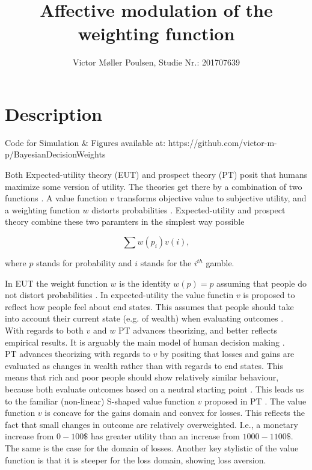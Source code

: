 \documentclass[12pt]{article}
\title{Affective modulation of the weighting function}
\author{Victor Møller Poulsen, Studie Nr.: 201707639}
\begin{document}
\maketitle
\leavevmode

\section{Description}

Code for Simulation \& Figures available at:
https://github.com/victor-m-p/BayesianDecisionWeights

Both Expected-utility theory (EUT) and prospect theory
(PT) posit that humans maximize some version of
utility. The theories get there by a
combination of two functions
\autocite{rottenstreich2001money}.
A value function $v$ transforms objective value to
subjective utility, and a weighting function $w$
distorts probabilities \autocite{rottenstreich2001money,
gonzalez1999shape}. Expected-utility and
prospect theory combine these two paramters in
the simplest way possible
\autocite{rottenstreich2001money}

\[
	\sum w(p_i)v(i),
\]

where $p$ stands for probability and $i$ stands for the
$i^{th}$ gamble.

In EUT the weight function $w$
is the identity $w(p) = p$ assuming that people do
not distort probabilities \autocite{rottenstreich2001money}.
In expected-utility the value functin $v$ is
proposed to reflect how people feel about
end states. This assumes that people should
take into account their current state (e.g. of wealth)
when evaluating outcomes
\autocite{newell2015straight}. \\

With regards to both $v$ and  $w$
PT \autocite{
	PT,
tversky1992advances} advances theorizing,
and better reflects empirical results.
It is arguably the main model of human decision making
\autocite{newell2015straight}. \\

PT advances theorizing
with regards to $v$ by positing that losses and
gains are evaluated as changes in wealth rather
than with regards to end states. This means that
rich and poor people should show relatively similar
behaviour, because both evaluate outcomes based
on a neutral starting point
\autocite{newell2015straight}.
This leads us to the familiar (non-linear) S-shaped
value function $v$ proposed in PT \autocite{PT}.
The value function $v$ is concave for the gains
domain and convex for losses. This reflects the
fact that small changes in outcome are relatively
overweighted. I.e., a monetary increase from
$0 - 100\$$ has greater utility than an increase
from $1000 - 1100\$$. The same is the case for the
domain of losses. Another key stylistic of the
value function is that it is steeper for the
loss domain, showing loss aversion. \\
\end{document}
